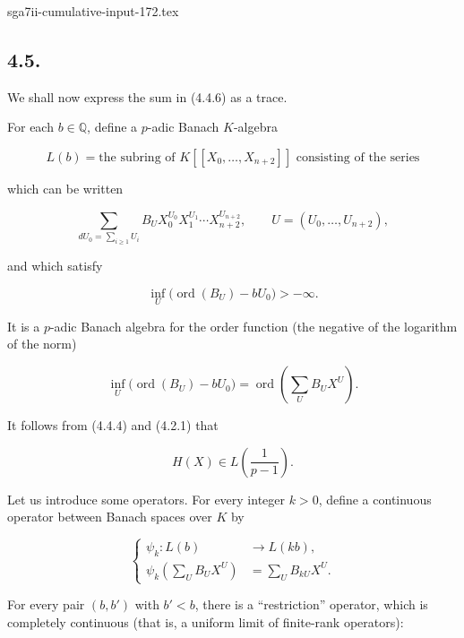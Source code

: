 \begin{filecontents*}{sga7ii-cumulative-input-172.tex}
\subsection*{4.5.}
We shall now express the sum in (4.4.6) as a trace.

For each $b\in\mathbb Q$, define a $p$-adic Banach $K$-algebra

\begin{equation}\tag{4.5.1}
L(b)=\text{the subring of $K[[X_0,\ldots,X_{n+2}]]$ consisting of the
series}
\end{equation}

which can be written

\begin{equation}\tag{4.5.2}
\sum_{dU_0=\sum_{i\geq1}U_i}
B_UX_0^{U_0}X_1^{U_1}\cdots X_{n+2}^{U_{n+2}},
\qquad U=(U_0,\ldots,U_{n+2}),
\end{equation}

and which satisfy

\begin{equation}\tag{4.5.3}
\inf_U\bigl(\operatorname{ord}(B_U)-bU_0\bigr)>-\infty.
\end{equation}

It is a $p$-adic Banach algebra for the order function (the negative of the
logarithm of the norm)

\begin{equation}\tag{4.5.4}
\inf_U\bigl(\operatorname{ord}(B_U)-bU_0\bigr)
=\operatorname{ord}\!\left(\sum_U B_UX^U\right).
\end{equation}

It follows from (4.4.4) and (4.2.1) that

\[
H(X)\in L\!\left(\frac1{p-1}\right).
\]

Let us introduce some operators. For every integer $k>0$, define a
continuous operator between Banach spaces over $K$ by

\begin{equation}\tag{4.5.5}
\left\{
\begin{aligned}
\psi_k:L(b)&\longrightarrow L(kb),\\
\psi_k\!\left(\sum_U B_UX^U\right)&=\sum_U B_{kU}X^U.
\end{aligned}
\right.
\end{equation}

For every pair $(b,b')$ with $b'<b$, there is a ``restriction'' operator,
which is completely continuous (that is, a uniform limit of finite-rank
operators):


\end{filecontents*}
